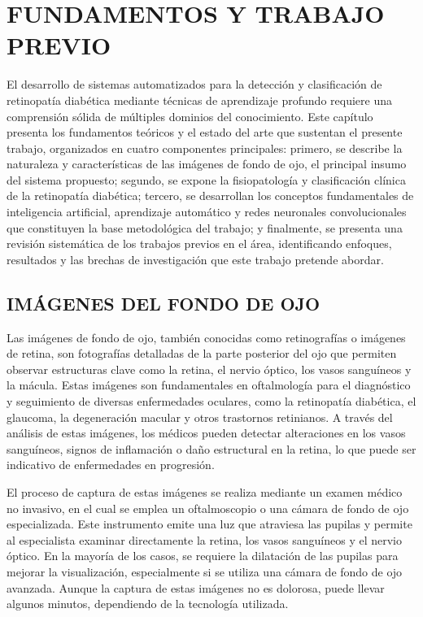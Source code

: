 \chapter{FUNDAMENTOS Y TRABAJO PREVIO} \label{chap:fundamentos}

El desarrollo de sistemas automatizados para la detección y clasificación de retinopatía diabética mediante técnicas de aprendizaje profundo requiere una comprensión sólida de múltiples dominios del conocimiento. Este capítulo presenta los fundamentos teóricos y el estado del arte que sustentan el presente trabajo, organizados en cuatro componentes principales: primero, se describe la naturaleza y características de las imágenes de fondo de ojo, el principal insumo del sistema propuesto; segundo, se expone la fisiopatología y clasificación clínica de la retinopatía diabética; tercero, se desarrollan los conceptos fundamentales de inteligencia artificial, aprendizaje automático y redes neuronales convolucionales que constituyen la base metodológica del trabajo; y finalmente, se presenta una revisión sistemática de los trabajos previos en el área, identificando enfoques, resultados y las brechas de investigación que este trabajo pretende abordar.

\section{IMÁGENES DEL FONDO DE OJO}

Las imágenes de fondo de ojo, también conocidas como retinografías o imágenes de retina, son fotografías detalladas de la parte posterior del ojo que permiten observar estructuras clave como la retina, el nervio óptico, los vasos sanguíneos y la mácula. Estas imágenes son fundamentales en oftalmología para el diagnóstico y seguimiento de diversas enfermedades oculares, como la retinopatía diabética, el glaucoma, la degeneración macular y otros trastornos retinianos. A través del análisis de estas imágenes, los médicos pueden detectar alteraciones en los vasos sanguíneos, signos de inflamación o daño estructural en la retina, lo que puede ser indicativo de enfermedades en progresión.

El proceso de captura de estas imágenes se realiza mediante un examen médico no invasivo, en el cual se emplea un oftalmoscopio o una cámara de fondo de ojo especializada. Este instrumento emite una luz que atraviesa las pupilas y permite al especialista examinar directamente la retina, los vasos sanguíneos y el nervio óptico. En la mayoría de los casos, se requiere la dilatación de las pupilas para mejorar la visualización, especialmente si se utiliza una cámara de fondo de ojo avanzada. Aunque la captura de estas imágenes no es dolorosa, puede llevar algunos minutos, dependiendo de la tecnología utilizada.

